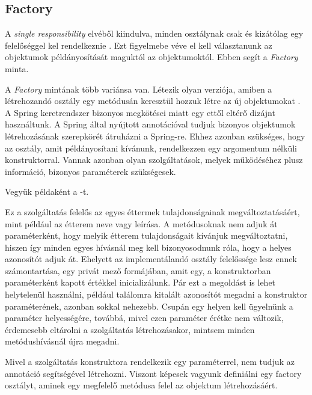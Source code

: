 \subsection{Factory}

A \emph{single responsibility} elvéből kiindulva, minden osztálynak csak és kizátólag egy felelőséggel kel rendelkeznie \cite{martin2003agile}. Ezt figyelmebe véve el kell választanunk az objektumok példányosítását maguktól az objektumoktól. Ebben segít a \emph{Factory} minta. \par

A \emph{Factory} mintának több variánsa van. Létezik olyan verziója, amiben a létrehozandó osztály egy metódusán keresztül hozzuk létre az új objektumokat \cite{gamma1995elements}. A Spring keretrendszer bizonyos megkötései miatt egy ettől eltérő dizájnt használtunk. A Spring által nyújtott  annotációval tudjuk bizonyos objektumok létrehozásának szerepkörét átruházni a Spring-re. Ehhez azonban szükséges, hogy az osztály, amit példányosítani kívánunk, rendelkezzen egy argomentum nélküli konstruktorral. Vannak azonban olyan szolgáltatások, melyek működéséhez plusz információ, bizonyos paraméterek szükségesek. \par

Vegyük példaként a -t.


Ez a szolgáltatás felelős az egyes éttermek tulajdonságainak megváltoztatásáért, mint például az étterem neve vagy leírása. A metódusoknak nem adjuk át paraméterként, hogy melyik étterem tulajdonságait kívánjuk megváltoztatni, hiszen így minden egyes hívásnál meg kell bizonyosodnunk róla, hogy a helyes azonosítót adjuk át. Ehelyett az implementálandó osztály felelőssége lesz ennek számontartása, egy privát mező formájában, amit egy, a konstruktorban paraméterként kapott értékkel inicializálunk. Pár ezt a megoldást is lehet helytelenül használni, például találomra kitalált azonosítót megadni a konstruktor paraméterének, azonban sokkal nehezebb. Csupán egy helyen kell ügyelnünk a paraméter helyességére, továbbá, mivel ezen paraméter érétke nem változik, érdemesebb eltárolni a szolgáltatás létrehozásakor, mintsem minden metódushívásnál újra megadni. \par

Mivel a szolgáltatás konstruktora rendelkezik egy paraméterrel, nem tudjuk az  annotáció segítségével létrehozni. Viszont képesek vagyunk definiálni egy factory osztályt, aminek egy megfelelő metódusa felel az objektum létrehozásáért. \par

